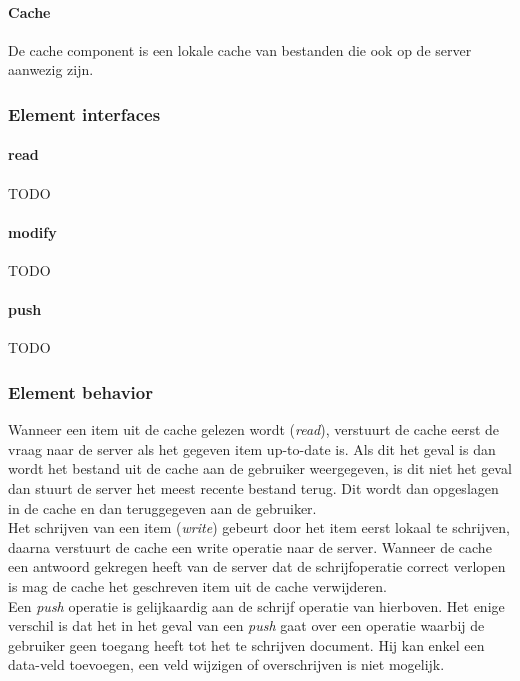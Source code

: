 \documentclass[a4paper,10pt]{paper}
\begin{document}
\paragraph{Cache}
De cache component is een lokale cache van bestanden die ook op de server aanwezig zijn.

\subsubsection{Element interfaces} 

\paragraph{read}
TODO

\paragraph{modify}
TODO

\paragraph{push}
TODO

\subsubsection{Element behavior}
Wanneer een item uit de cache gelezen wordt (\textit{read}), verstuurt de cache eerst de vraag naar de server als het gegeven item up-to-date is.  Als dit het geval is dan wordt het bestand uit de cache aan de gebruiker weergegeven, is dit niet het geval dan stuurt de server het meest recente bestand terug.  Dit wordt dan opgeslagen in de cache en dan teruggegeven aan de gebruiker.\\
Het schrijven van een item (\textit{write}) gebeurt door het item eerst lokaal te schrijven, daarna verstuurt de cache een write operatie naar de server.  Wanneer de cache een antwoord gekregen heeft van de server dat de schrijfoperatie correct verlopen is mag de cache het geschreven item uit de cache verwijderen.\\
Een \textit{push} operatie is gelijkaardig aan de schrijf operatie van hierboven.  Het enige verschil is dat het in het geval van een \textit{push} gaat over een operatie waarbij de gebruiker geen toegang heeft tot het te schrijven document.  Hij kan enkel een data-veld toevoegen, een veld wijzigen of overschrijven is niet mogelijk.
\end{document}

